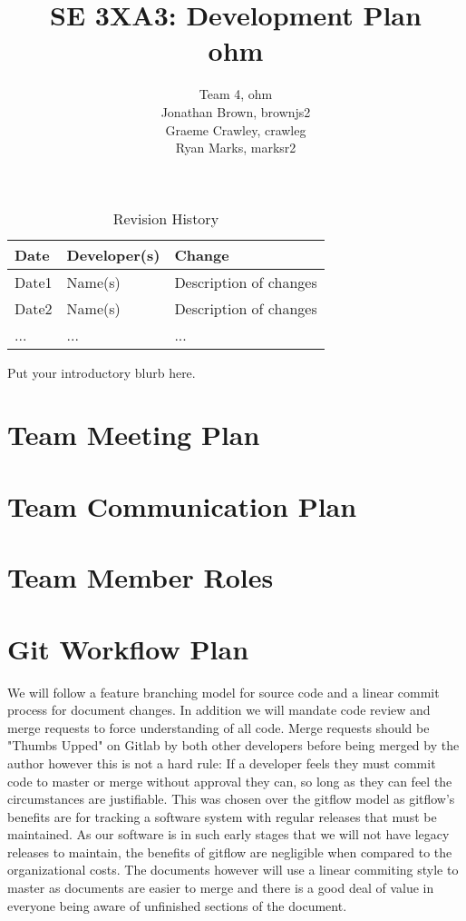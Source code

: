 \documentclass{article}
\title{SE 3XA3: Development Plan \\ohm}
\author{Team 4, ohm
		\\Jonathan Brown, brownjs2
		\\Graeme Crawley, crawleg
		\\Ryan Marks, marksr2
}
\date{}
\begin{document}
\begin{table}[hp]
\caption{Revision History} \label{TblRevisionHistory}
\begin{tabularx}{\textwidth}{llX}
\toprule
\textbf{Date} & \textbf{Developer(s)} & \textbf{Change}\\
\midrule
Date1 & Name(s) & Description of changes\\
Date2 & Name(s) & Description of changes\\
... & ... & ...\\
\bottomrule
\end{tabularx}
\end{table}

\newpage

\maketitle

Put your introductory blurb here.

\section{Team Meeting Plan}

\section{Team Communication Plan}

\section{Team Member Roles}

\section{Git Workflow Plan}

We will follow a feature branching model for source code and a linear commit process for document changes.
In addition we will mandate code review and merge requests to force understanding of all code.
Merge requests should be "Thumbs Upped" on Gitlab by both other developers before being merged by the author however this is not a hard rule:
If a developer feels they must commit code to master or merge without approval they can, so long as they can feel the circumstances are justifiable.
This was chosen over the gitflow model as gitflow's benefits are for tracking a software system with regular releases that must be maintained.
As our software is in such early stages that we will not have legacy releases to maintain, the benefits of gitflow are negligible when compared to the organizational costs.
The documents however will use a linear commiting style to master as documents are easier to merge and there is a good deal of value in everyone being aware of unfinished sections of the document.
\end{document}
